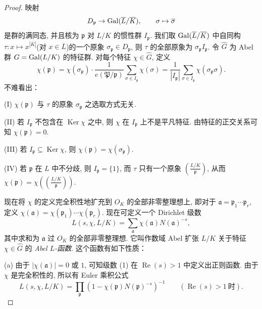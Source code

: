 \begin{proof}
映射
\[
  D_{\mathfrak{p}}\to\operatorname{Gal}(\overline{L}/\overline{K}),\qquad \sigma\mapsto\overline{\sigma}
\]
是群的满同态, 并且核为 $\mathfrak{p}$ 对 $L/K$ 的惯性群 $I_{\mathfrak{p}}$. 我们取 $\operatorname{Gal}(\overline{L}/\overline{K})$ 中自同构 $\tau\colon x\mapsto x^{|\overline{K}|}$(对 $x\in\overline{L}$)的一个原象 $\sigma_{\mathfrak{p}}\in D_{\mathfrak{p}}$, 则 $\tau$ 的全部原象为 $\sigma_{\mathfrak{p}}I_{\mathfrak{p}}$. 令 $\widehat{G}$ 为 Abel 群 $G=\operatorname{Gal}(L/K)$ 的特征群. 对每个特征 $\chi\in\widehat{G}$, 定义
\[
  \chi(\mathfrak{p})=\chi(\sigma_{\mathfrak{p}})\cdot\frac{1}{e(\mathfrak{P}/\mathfrak{p})}\sum_{\sigma\in I_{\mathfrak{p}}}\chi(\sigma)
  =\frac{1}{|I_{\mathfrak{p}}|}\sum_{\sigma\in I_{\mathfrak{p}}}\chi(\sigma_{\mathfrak{p}}\sigma).
\]
不难看出：

(I) $\chi(\mathfrak{p})$ 与 $\tau$ 的原象 $\sigma_{\mathfrak{p}}$ 之选取方式无关. 

(II) 若 $I_{\mathfrak{p}}$ 不包含在 $\operatorname{Ker}\chi$ 之中, 则 $\chi$ 在 $I_{\mathfrak{p}}$ 上不是平凡特征. 由特征的正交关系可知 $\chi(\mathfrak{p})=0$. 

(III) 若 $I_{\mathfrak{p}}\subseteq\operatorname{Ker}\chi$, 则 $\chi(\mathfrak{p})=\chi(\sigma_{\mathfrak{p}})$. 

(IV) 若 $\mathfrak{p}$ 在 $L$ 中不分歧, 则 $I_{\mathfrak{p}}=\{1\}$, 而 $\tau$ 只有一个原象 $\left(\frac{L/K}{\mathfrak{p}}\right)$, 从而 $\chi(\mathfrak{p})=\chi\left(\left(\frac{L/K}{\mathfrak{p}}\right)\right)$. 

现在将 $\chi$ 的定义完全积性地扩充到 $O_K$ 的全部非零整理想上, 即对于 $\mathfrak{a}=\mathfrak{p}_1\cdots\mathfrak{p}_r$, 定义 $\chi(\mathfrak{a})=\chi(\mathfrak{p}_1)\cdots\chi(\mathfrak{p}_r)$. 现在可定义一个 Dirichlet 级数
\begin{equation}\tag{1}
  L(s,\chi,L/K)=\sum_{\mathfrak{a}}\chi(\mathfrak{a})N(\mathfrak{a})^{-s},
\end{equation}
其中求和为 $\mathfrak{a}$ 过 $O_K$ 的全部非零整理想. 它叫作数域 Abel 扩张 $L/K$ 关于特征 $\chi\in\widehat{G}$ 的 \emph{Abel $L$-函数}. 这个函数有如下性质：

(a) 由于 $|\chi(\mathfrak{a})|=0$ 或 $1$, 可知级数 (1) 在 $\operatorname{Re}(s)>1$ 中定义出正则函数. 由于 $\chi$ 是完全积性的, 所以有 Euler 乘积公式
\[
  L(s,\chi,L/K)=\prod_{\mathfrak{p}}(1-\chi(\mathfrak{p})N(\mathfrak{p})^{-s})^{-1}\qquad(\operatorname{Re}(s)>1\ \text{时}).
\]


\end{proof}
